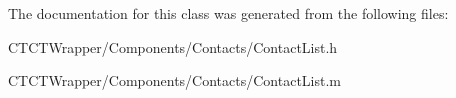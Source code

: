 The documentation for this class was generated from the following files\-:\begin{DoxyCompactItemize}
\item 
C\-T\-C\-T\-Wrapper/\-Components/\-Contacts/Contact\-List.\-h\item 
C\-T\-C\-T\-Wrapper/\-Components/\-Contacts/Contact\-List.\-m\end{DoxyCompactItemize}
